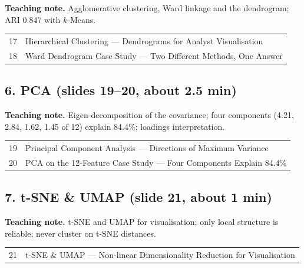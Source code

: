 \documentclass[11pt]{article}
\begin{document}
\textbf{Teaching note.} Agglomerative clustering, Ward linkage and the dendrogram; ARI 0.847 with $k$-Means.

\begin{center}\small\renewcommand{\arraystretch}{1.1}\begin{tabularx}{\textwidth}{@{}r X@{}}17 & Hierarchical Clustering --- Dendrograms for Analyst Visualisation\\
18 & Ward Dendrogram Case Study --- Two Different Methods, One Answer\\\end{tabularx}\end{center}

\subsection{6. PCA \normalfont\small\color{GreyN}(slides 19--20, about 2.5 min)}

\textbf{Teaching note.} Eigen-decomposition of the covariance; four components (4.21, 2.84, 1.62, 1.45 of 12) explain 84.4\%; loadings interpretation.

\begin{center}\small\renewcommand{\arraystretch}{1.1}\begin{tabularx}{\textwidth}{@{}r X@{}}19 & Principal Component Analysis --- Directions of Maximum Variance\\
20 & PCA on the 12-Feature Case Study --- Four Components Explain 84.4\%\\\end{tabularx}\end{center}

\subsection{7. t-SNE \& UMAP \normalfont\small\color{GreyN}(slide 21, about 1 min)}

\textbf{Teaching note.} t-SNE and UMAP for visualisation; only local structure is reliable; never cluster on t-SNE distances.

\begin{center}\small\renewcommand{\arraystretch}{1.1}\begin{tabularx}{\textwidth}{@{}r X@{}}21 & t-SNE \& UMAP --- Non-linear Dimensionality Reduction for Visualisation\\\end{tabularx}\end{center}
\end{document}
